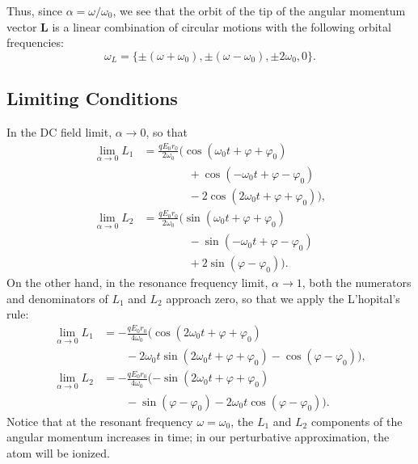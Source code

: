 \documentclass[twocolumn,showpacs,preprintnumbers,amsmath,amssymb]{revtex4}
\begin{document}
Thus, since $\alpha = \omega/\omega_0$, we see that the orbit of the tip of the angular momentum vector $\mathbf L$ is a linear combination of circular motions with the following orbital frequencies: 
\begin{equation}
\omega_L = \{\pm(\omega +\omega_0), \pm(\omega - \omega_0), \pm 2\omega_0, 0\}.
\end{equation}

\subsection{Limiting Conditions}

In the DC field limit, $\alpha\rightarrow 0$, so that 
\begin{subequations}
\begin{align}
\lim_{\alpha\rightarrow 0} L_1 &= \frac{qE_0r_0}{2\omega_0}(\cos(\omega_0 t +\varphi +\varphi_0) \nonumber \\
&\qquad \qquad+ \cos(-\omega_0 t +\varphi -\varphi_0) \nonumber \\
&\qquad \qquad - 2\cos(2\omega_0 t +\varphi +\varphi_0)),\\
\lim_{\alpha\rightarrow 0} L_2 &= \frac{qE_0r_0}{2\omega_0}(\sin(\omega_0 t +\varphi +\varphi_0) \nonumber\\
&\qquad \qquad- \sin(-\omega_0 t +\varphi -\varphi_0) \nonumber \\
&\qquad \qquad+ 2\sin(\varphi - \varphi_0)).
\end{align}
\end{subequations}
On the other hand, in the resonance frequency limit, $\alpha\rightarrow 1$, both the numerators and denominators of $L_1$ and $L_2$ approach zero, so that we apply the L'hopital's rule:
\begin{subequations}
\begin{align}
\lim_{\alpha\rightarrow 0} L_1 &= -\frac{qE_0r_0}{4\omega_0}(\cos(2\omega_0 t +\varphi +\varphi_0) \nonumber \\
&\qquad- 2\omega_0 t\sin(2\omega_0 t +\varphi +\varphi_0) - \cos(\varphi -\varphi_0)),\\
\lim_{\alpha\rightarrow 0} L_2 &= -\frac{qE_0r_0}{4\omega_0}(-\sin(2\omega_0 t +\varphi +\varphi_0) \nonumber \\
&\qquad- \sin(\varphi -\varphi_0) - 2\omega_0 t\cos(\varphi - \varphi_0)) .
\end{align}
\end{subequations}
Notice that at the resonant frequency $\omega = \omega_0$, the $L_1$ and $L_2$ components of the angular momentum increases in time; in our perturbative approximation, the atom will be ionized.
\end{document}
